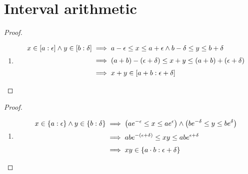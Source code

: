 \section{Interval arithmetic}



\begin{proof} ~
  \begin{enumerate}
    \item

      \begin{align}
        x \in \an[\epsilon]{a} \land y \in \an[\delta]{b} & \implies a-\epsilon \le x \le a+\epsilon \land b-\delta \le y \le b+\delta \nl
        & \implies (a+b)-(\epsilon + \delta) \le x+y \le (a+b)+(\epsilon + \delta) \nl
        & \implies x+y \in \an[\epsilon+\delta]{a+b}
      \end{align}
  \end{enumerate}
\end{proof}



\begin{proof} ~
  \begin{enumerate}
    \item

      \begin{align}
        x \in \ean[\epsilon]{a} \land y \in \ean[\delta]{b} & \implies \left(ae^{-\epsilon} \le x \le ae^{\epsilon}\right) \land \left(be^{-\delta} \le y \le be^\delta\right) \nl
        & \implies abe^{-(\epsilon+\delta)} \le xy \le abe^{\epsilon+\delta} \nl
        & \implies xy \in \ean[\epsilon+\delta]{a\cdot b}
      \end{align}
  \end{enumerate}

\end{proof}
